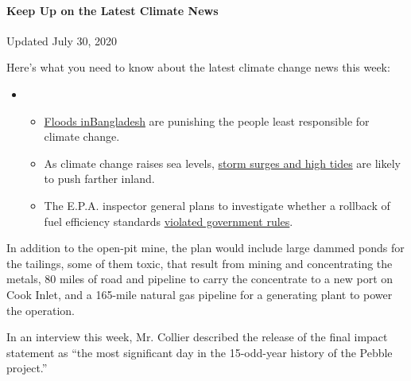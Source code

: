 \hypertarget{keep-up-on-the-latest-climate-news}{%
\paragraph{Keep Up on the Latest Climate
News}\label{keep-up-on-the-latest-climate-news}}

Updated July 30, 2020

Here's what you need to know about the latest climate change news this
week:

\begin{itemize}
\item
  \begin{itemize}
  \tightlist
  \item
    \href{https://www.nytimes3xbfgragh.onion/2020/07/30/climate/bangladesh-floods.html?action=click\&pgtype=Article\&state=default\&region=MAIN_CONTENT_1\&context=storylines_keepup}{Floods
    in}\href{https://www.nytimes3xbfgragh.onion/2020/07/30/climate/bangladesh-floods.html?action=click\&pgtype=Article\&state=default\&region=MAIN_CONTENT_1\&context=storylines_keepup}{Bangladesh}
    are punishing the people least responsible for climate change.
  \item
    As climate change raises sea levels,
    \href{https://www.nytimes3xbfgragh.onion/2020/07/30/climate/sea-level-inland-floods.html?action=click\&pgtype=Article\&state=default\&region=MAIN_CONTENT_1\&context=storylines_keepup}{storm
    surges and high tides} are likely to push farther inland.
  \item
    The E.P.A. inspector general plans to investigate whether a rollback
    of fuel efficiency standards
    \href{https://www.nytimes3xbfgragh.onion/2020/07/27/climate/trump-fuel-efficiency-rule.html?action=click\&pgtype=Article\&state=default\&region=MAIN_CONTENT_1\&context=storylines_keepup}{violated
    government rules}.
  \end{itemize}
\end{itemize}

In addition to the open-pit mine, the plan would include large dammed
ponds for the tailings, some of them toxic, that result from mining and
concentrating the metals, 80 miles of road and pipeline to carry the
concentrate to a new port on Cook Inlet, and a 165-mile natural gas
pipeline for a generating plant to power the operation.

In an interview this week, Mr. Collier described the release of the
final impact statement as ``the most significant day in the 15-odd-year
history of the Pebble project.''

